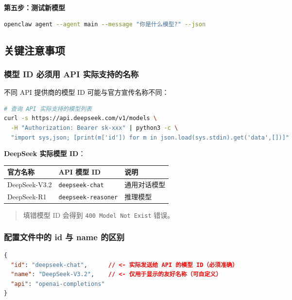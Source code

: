 \textbf{第五步：测试新模型}

\begin{lstlisting}[language=bash]
openclaw agent --agent main --message "你是什么模型?" --json
\end{lstlisting}

\subsection{关键注意事项}


\subsubsection{模型 ID 必须用 API 实际支持的名称}


不同 API 提供商的模型 ID 可能与官方宣传名称不同：

\begin{lstlisting}[language=bash]
# 查询 API 实际支持的模型列表
curl -s https://api.deepseek.com/v1/models \
  -H "Authorization: Bearer sk-xxx" | python3 -c \
  "import sys,json; [print(m['id']) for m in json.load(sys.stdin).get('data',[])]"
\end{lstlisting}

\textbf{DeepSeek 实际模型 ID}：

\begin{table}[h]
\centering
\small
\begin{tabular}{|l|l|l|}
\hline
官方名称 & API 模型 ID & 说明 \\
\hline
DeepSeek-V3.2 & \texttt{deepseek-chat} & 通用对话模型 \\
\hline
DeepSeek-R1 & \texttt{deepseek-reasoner} & 推理模型 \\
\hline
\end{tabular}
\end{table}

\begin{quote}
填错模型 ID 会得到 \texttt{400 Model Not Exist} 错误。
\end{quote}

\subsubsection{配置文件中的 id 与 name 的区别}


\begin{lstlisting}[language=json]
{
  "id": "deepseek-chat",      // <- 实际发送给 API 的模型 ID（必须准确）
  "name": "DeepSeek-V3.2",    // <- 仅用于显示的友好名称（可自定义）
  "api": "openai-completions"
}
\end{lstlisting}

